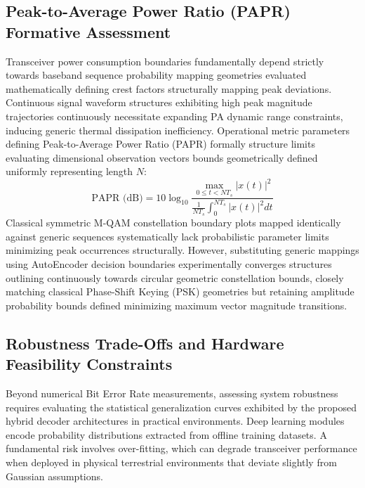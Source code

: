 \documentclass[a4paper,14pt]{extreport}
\begin{document}
\subsection{Peak-to-Average Power Ratio (PAPR) Formative Assessment}
Transceiver power consumption boundaries fundamentally depend strictly towards baseband sequence probability mapping geometries evaluated mathematically defining crest factors structurally mapping peak deviations. Continuous signal waveform structures exhibiting high peak magnitude trajectories continuously necessitate expanding PA dynamic range constraints, inducing generic thermal dissipation inefficiency. Operational metric parameters defining Peak-to-Average Power Ratio (PAPR) formally structure limits evaluating dimensional observation vectors bounds geometrically defined uniformly representing length $N$:
\begin{equation}
    \text{PAPR (dB)} = 10 \log_{10} \frac{ \max_{0 \leq t < N T_s} |x(t)|^2 }{ \frac{1}{N T_s} \int_{0}^{N T_s} |x(t)|^2 dt }
\end{equation}
Classical symmetric M-QAM constellation boundary plots mapped identically against generic sequences systematically lack probabilistic parameter limits minimizing peak occurrences structurally. However, substituting generic mappings using AutoEncoder decision boundaries experimentally converges structures outlining continuously towards circular geometric constellation bounds, closely matching classical Phase-Shift Keying (PSK) geometries but retaining amplitude probability bounds defined minimizing maximum vector magnitude transitions.

\subsection{Robustness Trade-Offs and Hardware Feasibility Constraints}

Beyond numerical Bit Error Rate measurements, assessing system robustness requires evaluating the statistical generalization curves exhibited by the proposed hybrid decoder architectures in practical environments. Deep learning modules encode probability distributions extracted from offline training datasets. A fundamental risk involves over-fitting, which can degrade transceiver performance when deployed in physical terrestrial environments that deviate slightly from Gaussian assumptions.
\end{document}
